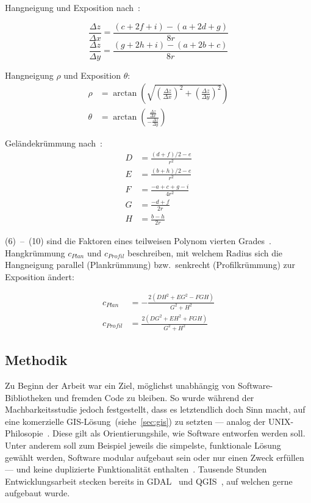 \begin{multicols}{2}
Hangneigung und Exposition nach~\cite{gisslopeaspect}:

\begin{equation} \label{eq1}
  \frac{\Delta z}{\Delta x} = \frac{(c + 2f + i) - (a + 2d + g)}{8r}
\end{equation}
\begin{equation} \label{eq2}
  \frac{\Delta z}{\Delta y} = \frac{(g + 2h + i) - (a + 2b + c)}{8r}
\end{equation}

Hangneigung $\rho$ und Exposition $\theta$:
\begin{align}
  \rho &= \arctan \left( \sqrt{
    {\left( \frac{\Delta z}{\Delta x}\right)}^2 + 
    {\left(\frac{\Delta z}{\Delta y}\right)}^2}
  \right)\\
  \theta &= \arctan\left(\frac{\frac{\Delta z}{\Delta x}}{-\frac{\Delta z}{\Delta y}}\right)
\end{align}

Geländekrümmung nach~\cite{gismath}:
\begin{align}
  D &= \frac{{(d + f) / 2 - e}}{{r^2}} \\
  E &= \frac{{(b + h) / 2 - e}}{{r^2}} \\
  F &= \frac{{-a + c + g - i}}{{4r^2}} \\
  G &= \frac{{-d + f}}{{2r}} \\
  H &= \frac{{b - h}}{{2r}}
\end{align}

(6)~--~(10) sind die Faktoren eines teilweisen Polynom vierten Grades~\cite{gismath}.
Hangkrümmung $c_{Plan}$ und $c_{Profil}$ beschreiben, mit welchem Radius sich die Hangneigung parallel (Plankrümmung) bzw.\ senkrecht (Profilkrümmung) zur Exposition ändert:

\begin{align}
    c_{Plan} &= -\frac{{2(DH^2 + EG^2 - FGH)}}{{G^2 + H^2}}
    \\
    c_{Profil} &= \frac{{2(DG^2 + EH^2 + FGH)}}{{G^2 + H^2}}
\end{align}

\vfill

\pagebreak





\subsection{Methodik}

Zu Beginn der Arbeit war ein Ziel, möglichst unabhängig von Software-Bibliotheken und fremden Code zu bleiben. So wurde während der Machbarkeitsstudie jedoch festgestellt, dass es letztendlich doch Sinn macht, auf eine komerzielle GIS-Lösung~(siehe~\ref{sec:gis}) zu setzten --- analog der UNIX-Philosopie~\cite{unixphil}. Diese gilt als Orientierungshile, wie Software entworfen werden soll. Unter anderem soll zum Beispiel jeweils die simpelste, funktionale Lösung gewählt werden, Software modular aufgebaut sein oder nur einen Zweck erfüllen --- und keine duplizierte Funktionalität enthalten~\cite{unixphil}. Tausende Stunden Entwicklungsarbeit stecken bereits in GDAL~\cite{gdalmanual} und QGIS~\cite{qgis}, auf welchen gerne aufgebaut wurde.

\end{multicols}
